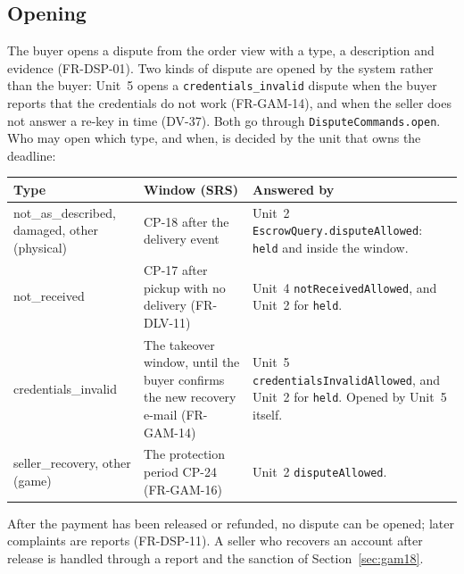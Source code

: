 \documentclass[11pt,a4paper]{article}
\newenvironment{dtable}[1]{\small\begin{longtable}{#1}}{\end{longtable}}
\begin{document}
\subsection{Opening}
\label{sec:opening}
The buyer opens a dispute from the order view with a type, a description and evidence (FR-DSP-01). Two kinds of dispute are opened by the system rather than the buyer: Unit~5 opens a \texttt{credentials\_invalid} dispute when the buyer reports that the credentials do not work (FR-GAM-14), and when the seller does not answer a re-key in time (DV-37). Both go through \texttt{DisputeCommands.open}. Who may open which type, and when, is decided by the unit that owns the deadline:
\begin{dtable}{@{}>{\ttfamily\raggedright\arraybackslash}p{3.3cm}>{\raggedright\arraybackslash}p{5.4cm}>{\raggedright\arraybackslash}p{6.5cm}@{}}
\toprule
\textnormal{\textbf{Type}} & \textbf{Window (SRS)} & \textbf{Answered by} \\ \midrule \endhead
not\_as\_described, damaged, other (physical) & CP-18 after the delivery event & Unit~2 \texttt{EscrowQuery.disputeAllowed}: \texttt{held} and inside the window. \\
not\_received & CP-17 after pickup with no delivery (FR-DLV-11) & Unit~4 \texttt{notReceivedAllowed}, and Unit~2 for \texttt{held}. \\
credentials\_invalid & The takeover window, until the buyer confirms the new recovery e-mail (FR-GAM-14) & Unit~5 \texttt{credentials\-Invalid\-Allowed}, and Unit~2 for \texttt{held}. Opened by Unit~5 itself. \\
seller\_recovery, other (game) & The protection period CP-24 (FR-GAM-16) & Unit~2 \texttt{disputeAllowed}. \\
\bottomrule
\end{dtable}
After the payment has been released or refunded, no dispute can be opened; later complaints are reports (FR-DSP-11). A seller who recovers an account after release is handled through a report and the sanction of Section~\ref{sec:gam18}.
\end{document}
